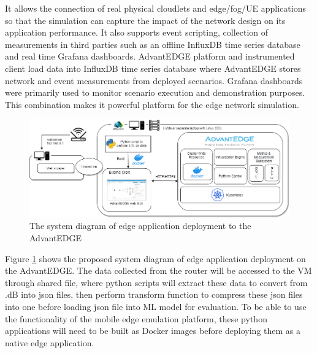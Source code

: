 It allows the connection of real physical cloudlets and edge/fog/UE applications so that the simulation can capture the impact of the network design on its application performance. It also supports event scripting, collection of measurements in third parties such as an offline InfluxDB time series database and real time Grafana dashboards. AdvantEDGE platform and instrumented client load data into InfluxDB time series database where AdvantEDGE stores network and event measurements from deployed scenarios. Grafana dashboards were primarily used to monitor scenario execution and demonstration purposes. This combination makes it powerful platform for the edge network simulation.

\begin{figure}[ht]
    \centering
    \includegraphics[width=1\linewidth]{pages/Chapter3/Chapter 3 images/System Diagram.png}
    \caption{The system diagram of edge application deployment to the AdvantEDGE}
    \label{fig:AdvantEDGE_edge_design}
\end{figure}

Figure \ref{fig:AdvantEDGE_edge_design} shows the proposed system diagram of edge application deployment on the AdvantEDGE. The data collected from the router will be accessed to the VM through shared file, where python scripts will extract these data to convert from .dB into json files, then perform transform function to compress these json files into one before loading json file into ML model for evaluation. To be able to use the functionality of the mobile edge emulation platform, these python applications will need to be built as Docker images before deploying them as a native edge application.

